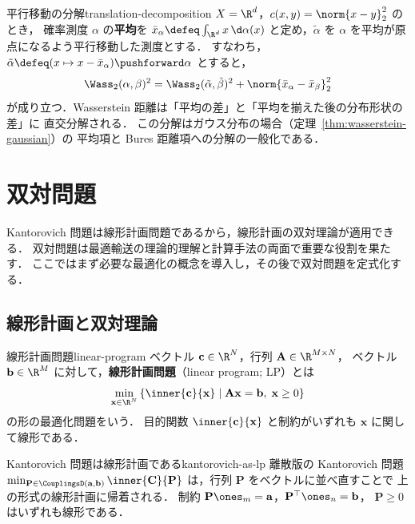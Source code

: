 \begin{remark}{平行移動の分解}{translation-decomposition}
  $X = \R^d$，$c(x,y) = \norm{x - y}_2^2$ のとき，
  確率測度 $\alpha$ の\textbf{平均}を
  $\bar{x}_\alpha \defeq \int_{\R^d} x \, \d\alpha(x)$
  と定め，$\tilde{\alpha}$ を $\alpha$ を平均が原点になるよう平行移動した測度とする．
  すなわち，$\tilde{\alpha} \defeq (x \mapsto x - \bar{x}_\alpha)\pushforward \alpha$ とすると，
  \[
    \Wass_2(\alpha, \beta)^2
    = \Wass_2(\tilde{\alpha}, \tilde{\beta})^2
    + \norm{\bar{x}_\alpha - \bar{x}_\beta}_2^2
  \]
  が成り立つ．Wasserstein 距離は「平均の差」と「平均を揃えた後の分布形状の差」に
  直交分解される．
  この分解はガウス分布の場合（定理~\ref{thm:wasserstein-gaussian}）の
  平均項と Bures 距離項への分解の一般化である．
\end{remark}

\section{双対問題}
\label{sec:dual}

Kantorovich 問題は線形計画問題であるから，線形計画の双対理論が適用できる．
双対問題は最適輸送の理論的理解と計算手法の両面で重要な役割を果たす．
ここではまず必要な最適化の概念を導入し，その後で双対問題を定式化する．

\subsection{線形計画と双対理論}
\label{subsec:lp-duality}

\begin{definition}{線形計画問題}{linear-program}
  ベクトル $\mathbf{c} \in \R^N$，行列 $\mathbf{A} \in \R^{M \times N}$，
  ベクトル $\mathbf{b} \in \R^M$ に対して，\textbf{線形計画問題}（linear program; LP）とは
  \[
    \min_{\mathbf{x} \in \R^N} \left\{
    \inner{\mathbf{c}}{\mathbf{x}} \;\middle|\;
    \mathbf{A}\mathbf{x} = \mathbf{b}, \; \mathbf{x} \geq 0
    \right\}
  \]
  の形の最適化問題をいう．
  目的関数 $\inner{\mathbf{c}}{\mathbf{x}}$ と制約がいずれも $\mathbf{x}$ に関して線形である．
\end{definition}

\begin{remark}{Kantorovich 問題は線形計画である}{kantorovich-as-lp}
  離散版の Kantorovich 問題
  $\min_{\mathbf{P} \in \CouplingsD(\mathbf{a}, \mathbf{b})} \inner{\mathbf{C}}{\mathbf{P}}$
  は，行列 $\mathbf{P}$ をベクトルに並べ直すことで
  上の形式の線形計画に帰着される．
  制約 $\mathbf{P}\ones_m = \mathbf{a}$，$\mathbf{P}^\top \ones_n = \mathbf{b}$，
  $\mathbf{P} \geq 0$ はいずれも線形である．
\end{remark}

